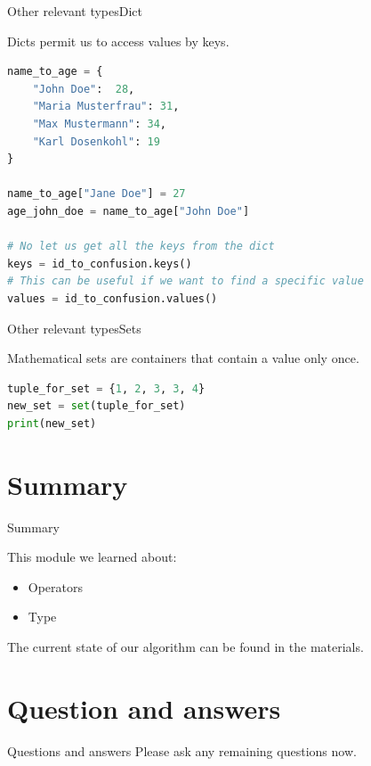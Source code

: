 \documentclass[aspectratio=169]{beamer}
\begin{document}
\begin{frame}[fragile]{Other relevant types}{Dict}

Dicts permit us to access values by keys.

\begin{lstlisting}[language=Python, frame=single, basicstyle=\footnotesize]
name_to_age = {
    "John Doe":  28,
    "Maria Musterfrau": 31,
    "Max Mustermann": 34,
    "Karl Dosenkohl": 19
}

name_to_age["Jane Doe"] = 27
age_john_doe = name_to_age["John Doe"]

# No let us get all the keys from the dict
keys = id_to_confusion.keys()
# This can be useful if we want to find a specific value
values = id_to_confusion.values()
\end{lstlisting}

\end{frame}

\begin{frame}[fragile]{Other relevant types}{Sets}

Mathematical sets are containers that contain a value only once.

\begin{lstlisting}[language=Python, frame=single]
tuple_for_set = {1, 2, 3, 3, 4}
new_set = set(tuple_for_set)
print(new_set)
\end{lstlisting}

\end{frame}

\section{Summary}
\begin{frame}{Summary}

This module we learned about:
\begin{itemize}
	\item Operators
	\item Type
\end{itemize}

\vspace{2em}

The current state of our algorithm can be found in the materials.

\end{frame}

\section{Question and answers}
\begin{frame}{Questions and answers}
\huge
\centering
Please ask any remaining questions now.
\end{frame}
\end{document}
